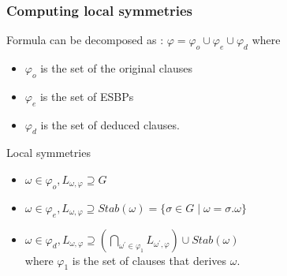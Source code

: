 \documentclass{beamer}
\begin{document}
\begin{frame}[noframenumbering]
\frametitle{Computing local symmetries}

Formula can be decomposed as : $\varphi = \varphi_o \cup \varphi_e \cup \varphi_d$ where
\begin{itemize}
\item $\varphi_o$ is the set of the original clauses
\item $\varphi_e$ is the set of ESBPs
\item $\varphi_d$ is the set of deduced clauses.
\end{itemize}

\vfill

Local symmetries
\begin{itemize}
\item $\omega \in \varphi_o, L_{\omega,\varphi} \supseteq G $ %
\item $\omega \in \varphi_e, L_{\omega,\varphi} \supseteq Stab(\omega)=\{\sigma \in G \mid
\omega = \sigma.\omega\}$
\item $\omega \in \varphi_d, L_{\omega,\varphi} \supseteq (\underset{\omega^\prime \in
	\varphi_1}{\bigcap}L_{\omega^\prime,\varphi}) \cup Stab(\omega)$ \\  where $\varphi_1$ is the set of clauses that derives $\omega$.
\end{itemize}

\end{frame}
\end{document}
